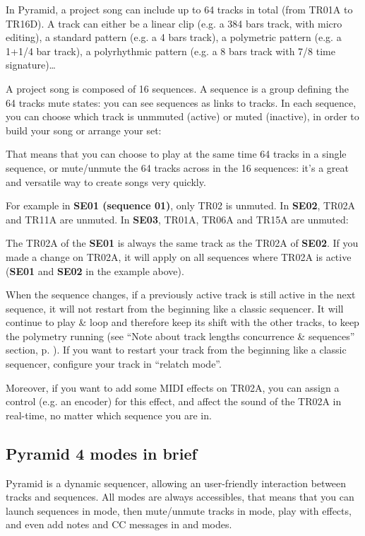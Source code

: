 In Pyramid, a project song can include up to 64 tracks in total (from TR01A to TR16D). A track can either be a linear clip (e.g. a 384 bars track, with micro editing), a standard pattern (e.g. a 4 bars track), a polymetric pattern (e.g. a 1+1/4 bar track), a polyrhythmic pattern (e.g. a 8 bars track with 7/8 time signature)…

A project song is composed of 16 sequences. A sequence is a group defining the 64 tracks mute states: you can see sequences as links to tracks. In each sequence, you can choose which track is unmmuted (active) or muted (inactive), in order to build your song or arrange your set:


That means that you can choose to play at the same time 64 tracks in a single sequence, or mute/unmute the 64 tracks across in the 16 sequences: it's a great and versatile way to create songs very quickly.

For example in \textbf{SE01 (sequence 01)}, only TR02 is unmuted. In \textbf{SE02}, TR02A and TR11A are unmuted. In \textbf{SE03}, TR01A, TR06A and TR15A are unmuted:


The TR02A of the \textbf{SE01} is always the same track as the TR02A of \textbf{SE02}. If you made a change on TR02A, it will apply on all sequences where TR02A is active (\textbf{SE01} and \textbf{SE02} in the example above).

When the sequence changes, if a previously active track is still active in the next sequence, it will not restart from the beginning like a classic sequencer. It will continue to play \& loop and therefore keep its shift with the other tracks, to keep the polymetry running (see ``Note about track lengths concurrence \& sequences'' section, p. \pageref{sec:note-track-len-seq}). If you want to restart your track from the beginning like a classic sequencer, configure your track in ``relatch mode''.

Moreover, if you want to add some MIDI effects on TR02A, you can assign a control (e.g. an encoder) for this effect, and affect the sound of the TR02A in real-time, no matter which sequence you are in.


\subsection{Pyramid 4 modes in brief}

Pyramid is a dynamic sequencer, allowing an user-friendly interaction between tracks and sequences. All modes are always accessibles, that means that you can launch sequences in  mode, then mute/unmute tracks in  mode, play with effects, and even add notes and CC messages in  and   modes.

